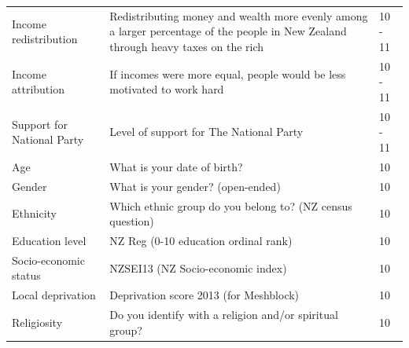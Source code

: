 \documentclass[
  man,floatsintext]{apa6}
\begin{document}
\begin{table}[h]
\begin{center}
\begin{threeparttable}
{\begin{tabular}{p{4.2cm}p{9cm}p{1cm}}
Income redistribution & Redistributing money and wealth more evenly among a larger percentage of the people in New Zealand through heavy taxes on the rich & 10 - 11\\
Income attribution & If incomes were more equal, people would be less motivated to work hard & 10 - 11\\
Support for National Party & Level of support for The National Party & 10 - 11\\
Age & What is your date of birth? & 10\\
Gender & What is your gender? (open-ended) & 10\\
Ethnicity & Which ethnic group do you belong to? (NZ census question) & 10\\
Education level & NZ Reg (0-10 education ordinal rank) & 10\\
Socio-economic status & NZSEI13 (NZ Socio-economic index) & 10\\
Local deprivation & Deprivation score 2013 (for Meshblock) & 10\\
Religiosity & Do you identify with a religion and/or spiritual group? & 10\\
\bottomrule
\end{tabular}

}

\end{threeparttable}
\end{center}

\end{table}
\end{document}
